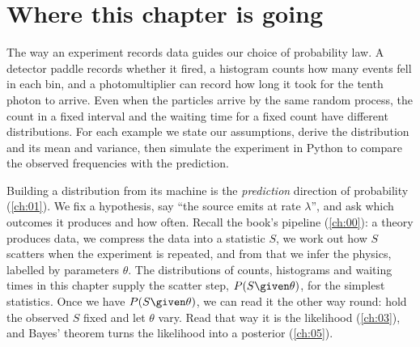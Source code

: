 \providecommand{\twoaDTpFanoTh}{}\renewcommand{\twoaDTpFanoTh}{0.6106}
\providecommand{\twoaDTnHat}{}\renewcommand{\twoaDTnHat}{5.002}
\providecommand{\twoaDTRawPull}{}\renewcommand{\twoaDTRawPull}{-1.8}
\providecommand{\twoaDTnpPull}{}\renewcommand{\twoaDTnpPull}{-1.7}
\providecommand{\twoaDTpPull}{}\renewcommand{\twoaDTpPull}{-1.8}
\providecommand{\twoaDTnHatPull}{}\renewcommand{\twoaDTnHatPull}{0.5}
\providecommand{\twoaGaussDiffFour}{}\renewcommand{\twoaGaussDiffFour}{0.02554}
\providecommand{\twoaGaussDiffTwentyfive}{}\renewcommand{\twoaGaussDiffTwentyfive}{0.003868}
\providecommand{\twoaGaussDiffHundred}{}\renewcommand{\twoaGaussDiffHundred}{9.388\times10^{-4}}
\providecommand{\twoaGaussDiffFourHundred}{}\renewcommand{\twoaGaussDiffFourHundred}{2.323\times10^{-4}}
\providecommand{\twoaTailPois}{}\renewcommand{\twoaTailPois}{2.001\times10^{-4}}
\providecommand{\twoaTailGauss}{}\renewcommand{\twoaTailGauss}{3.167\times10^{-5}}
\providecommand{\twoaTailGaussCC}{}\renewcommand{\twoaTailGaussCC}{4.810\times10^{-5}}
\providecommand{\twoaTailRatio}{}\renewcommand{\twoaTailRatio}{6.319}
\section*{Where this chapter is going}

The way an experiment records data guides our choice of probability law. A detector paddle records whether it fired, a histogram counts how many events fell in each bin, and a photomultiplier can record how long it took for the tenth photon to arrive. Even when the particles arrive by the same random process, the count in a fixed interval and the waiting time for a fixed count have different distributions. For each example we state our assumptions, derive the distribution and its mean and variance, then simulate the experiment in Python to compare the observed frequencies with the prediction.

Building a distribution from its machine is the \emph{prediction} direction of probability (\cref{ch:01}). We fix a hypothesis, say ``the source emits at rate $\lambda$'', and ask which outcomes it produces and how often. Recall the book's pipeline (\cref{ch:00}): a theory produces data, we compress the data into a statistic $S$, we work out how $S$ scatters when the experiment is repeated, and from that we infer the physics, labelled by parameters $\theta$. The distributions of counts, histograms and waiting times in this chapter supply the scatter step, $P(S\given\theta)$, for the simplest statistics. Once we have $P(S\given\theta)$, we can read it the other way round: hold the observed $S$ fixed and let $\theta$ vary. Read that way it is the likelihood (\cref{ch:03}), and Bayes' theorem turns the likelihood into a posterior (\cref{ch:05}).

